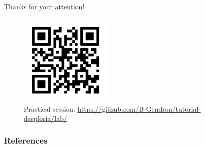 \documentclass[11pt,aspectratio=169]{beamer}
\begin{document}
\begin{frame}[plain]
    \begin{center}
        \vspace{0.5cm}
        {\color{roose}\Huge Thanks for your attention!}
        
        \vspace{0.3cm}
        
        \begin{figure}[h]
            \centering
            \includegraphics[width=0.4\textwidth]{qr_code.png}
            \caption{\centering Practical session: \url{https://github.com/B-Gendron/tutorial-deeploria/lab/}}
        \end{figure}
    \end{center}
\end{frame}

\begin{frame}
    \frametitle{References}
    \printbibliography
\end{frame}

\end{document}
